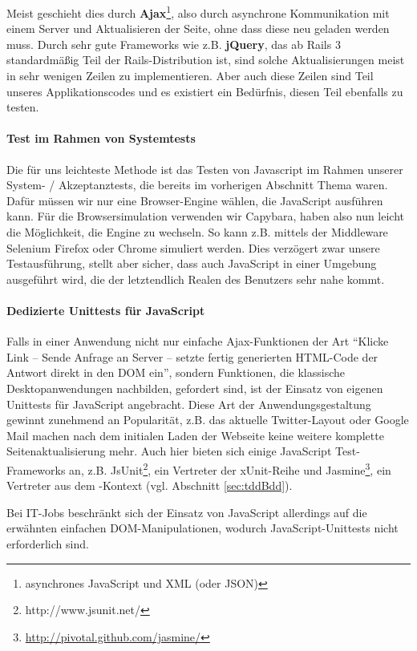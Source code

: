 Meist geschieht dies durch \textbf{Ajax}\footnote{asynchrones JavaScript und XML (oder JSON)}, also durch asynchrone Kommunikation mit einem Server und Aktualisieren der Seite, ohne dass diese neu geladen werden muss. Durch sehr gute Frameworks wie z.B. \textbf{jQuery}, das ab Rails 3 standardmäßig Teil der Rails-Distribution ist, sind solche Aktualisierungen meist in sehr wenigen Zeilen zu implementieren. Aber auch diese Zeilen sind Teil unseres Applikationscodes und es existiert ein Bedürfnis, diesen Teil ebenfalls zu testen.


\paragraph{Test im Rahmen von Systemtests} Die für uns leichteste Methode ist das Testen von Javascript im Rahmen unserer System- / Akzeptanztests, die bereits im vorherigen Abschnitt Thema waren. Dafür müssen wir nur eine Browser-Engine wählen, die JavaScript ausführen kann. Für die Browsersimulation verwenden wir Capybara, haben also nun leicht die Möglichkeit, die Engine zu wechseln. So kann z.B. mittels der Middleware Selenium Firefox oder Chrome simuliert werden. Dies verzögert zwar unsere Testausführung, stellt aber sicher, dass auch JavaScript in einer Umgebung ausgeführt wird, die der letztendlich Realen des Benutzers sehr nahe kommt.
\paragraph{Dedizierte Unittests für JavaScript} Falls in einer Anwendung nicht nur einfache Ajax-Funktionen der Art "`Klicke Link -- Sende Anfrage an Server -- setzte fertig generierten HTML-Code der Antwort direkt in den DOM ein"', sondern Funktionen, die klassische Desktopanwendungen nachbilden, gefordert sind, ist der Einsatz von eigenen Unittests für JavaScript angebracht.
Diese Art der Anwendungsgestaltung gewinnt zunehmend an Popularität, z.B. das aktuelle Twitter-Layout oder Google Mail machen nach dem initialen Laden der Webseite keine weitere komplette Seitenaktualisierung mehr.
Auch hier bieten sich einige JavaScript Test-Frameworks an, z.B. JsUnit\footnote{http://www.jsunit.net/}, ein Vertreter der xUnit-Reihe und Jasmine\footnote{\url{http://pivotal.github.com/jasmine/}}, ein Vertreter aus dem -Kontext (vgl. Abschnitt \ref{sec:tddBdd}).

Bei IT-Jobs beschränkt sich der Einsatz von JavaScript allerdings auf die erwähnten einfachen DOM-Manipulationen, wodurch JavaScript-Unittests nicht erforderlich sind.


